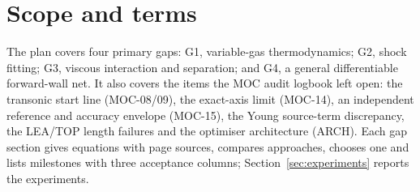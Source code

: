\section{Scope and terms}
\label{sec:scope}
The plan covers four primary gaps: G1, variable-gas thermodynamics; G2, shock fitting;
G3, viscous interaction and separation; and G4, a general differentiable forward-wall
net. It also covers the items the MOC audit logbook left open: the transonic start
line (MOC-08/09), the exact-axis limit (MOC-14), an independent reference and accuracy
envelope (MOC-15), the Young source-term discrepancy, the LEA/TOP length failures and
the optimiser architecture (ARCH). Each gap section gives equations with page sources,
compares approaches, chooses one and lists milestones with three acceptance columns;
Section~\ref{sec:experiments} reports the experiments.

